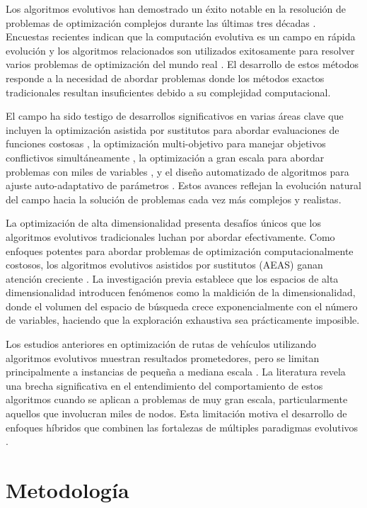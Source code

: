 \documentclass[12pt,a4paper]{article}
\begin{document}
Los algoritmos evolutivos han demostrado un éxito notable en la resolución de problemas de optimización complejos durante las últimas tres décadas \cite{fogel2006,back2013}. Encuestas recientes indican que la computación evolutiva es un campo en rápida evolución y los algoritmos relacionados son utilizados exitosamente para resolver varios problemas de optimización del mundo real \cite{yang2013}. El desarrollo de estos métodos responde a la necesidad de abordar problemas donde los métodos exactos tradicionales resultan insuficientes debido a su complejidad computacional.

El campo ha sido testigo de desarrollos significativos en varias áreas clave que incluyen la optimización asistida por sustitutos para abordar evaluaciones de funciones costosas \cite{jin2011}, la optimización multi-objetivo para manejar objetivos conflictivos simultáneamente \cite{coello2007,zhang2008}, la optimización a gran escala para abordar problemas con miles de variables \cite{lozano2011}, y el diseño automatizado de algoritmos para ajuste auto-adaptativo de parámetros \cite{brest2006}. Estos avances reflejan la evolución natural del campo hacia la solución de problemas cada vez más complejos y realistas.

La optimización de alta dimensionalidad presenta desafíos únicos que los algoritmos evolutivos tradicionales luchan por abordar efectivamente. Como enfoques potentes para abordar problemas de optimización computacionalmente costosos, los algoritmos evolutivos asistidos por sustitutos (AEAS) ganan atención creciente \cite{wang2018}. La investigación previa establece que los espacios de alta dimensionalidad introducen fenómenos como la maldición de la dimensionalidad, donde el volumen del espacio de búsqueda crece exponencialmente con el número de variables, haciendo que la exploración exhaustiva sea prácticamente imposible.

Los estudios anteriores en optimización de rutas de vehículos utilizando algoritmos evolutivos muestran resultados prometedores, pero se limitan principalmente a instancias de pequeña a mediana escala \cite{rego2011}. La literatura revela una brecha significativa en el entendimiento del comportamiento de estos algoritmos cuando se aplican a problemas de muy gran escala, particularmente aquellos que involucran miles de nodos. Esta limitación motiva el desarrollo de enfoques híbridos que combinen las fortalezas de múltiples paradigmas evolutivos \cite{potter2000}.

\section{Metodología}
\end{document}
